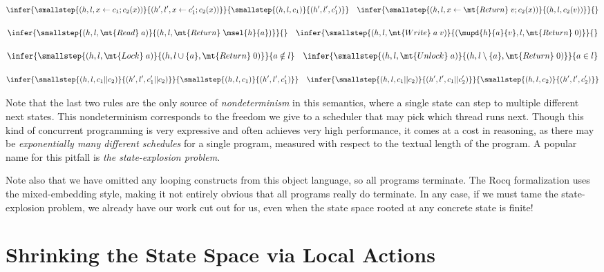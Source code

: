 \documentclass{amsbook}
\theoremstyle{definition}
\theoremstyle{remark}
\numberwithin{section}{chapter}
\numberwithin{equation}{chapter}
\begin{document}
$$\infer{\smallstep{(h, l, x \leftarrow c_1; c_2(x))}{(h', l', x \leftarrow c'_1; c_2(x))}}{
  \smallstep{(h, l, c_1)}{(h', l', c'_1)}
}
\quad \infer{\smallstep{(h, l, x \leftarrow \mt{Return} \; v; c_2(x))}{(h, l, c_2(v))}}{}$$

$$\infer{\smallstep{(h, l, \mt{Read} \; a)}{(h, l, \mt{Return} \; \msel{h}{a})}}{}
\quad \infer{\smallstep{(h, l, \mt{Write} \; a \; v)}{(\mupd{h}{a}{v}, l, \mt{Return} \; 0)}}{}$$

$$\infer{\smallstep{(h, l, \mt{Lock} \; a)}{(h, l \cup \{a\}, \mt{Return} \; 0)}}{
  a \notin l
}
\quad \infer{\smallstep{(h, l, \mt{Unlock} \; a)}{(h, l \setminus \{a\}, \mt{Return} \; 0)}}{
  a \in l
}$$

$$\infer{\smallstep{(h, l, c_1 || c_2)}{(h', l', c'_1 || c_2)}}{
  \smallstep{(h, l, c_1)}{(h', l', c'_1)}
}
\quad \infer{\smallstep{(h, l, c_1 || c_2)}{(h', l', c_1 || c'_2)}}{
  \smallstep{(h, l, c_2)}{(h', l', c'_2)}
}$$

Note that the last two rules are the only source of \emph{nondeterminism} in this semantics, where a single state can step to multiple different next states.
This nondeterminism corresponds to the freedom we give to a scheduler that may pick which thread runs next.
Though this kind of concurrent programming is very expressive and often achieves very high performance, it comes at a cost in reasoning, as there may be \emph{exponentially many different schedules} for a single program, measured with respect to the textual length of the program.
A popular name for this pitfall is \emph{the state-explosion problem}.

Note also that we have omitted any looping constructs from this object language, so all programs terminate.
The Rocq formalization uses the mixed-embedding style, making it not entirely obvious that all programs really do terminate.
In any case, if we must tame the state-explosion problem, we already have our work cut out for us, even when the state space rooted at any concrete state is finite!


\section{Shrinking the State Space via Local Actions}

\newcommand{\natf}[1]{\mt{natf}(#1)}
\end{document}
